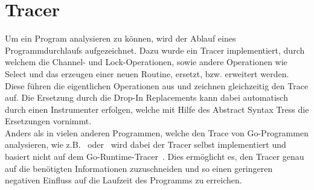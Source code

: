 \chapter{Tracer}
Um ein Program analysieren zu können, wird der Ablauf eines Programmdurchlaufs
aufgezeichnet. Dazu wurde ein Tracer implementiert, durch welchem die 
Channel- und Lock-Operationen, sowie andere Operationen wie Select und das 
erzeugen einer neuen Routine, ersetzt, bzw. erweitert werden. Diese 
führen die eigentlichen Operationen aus und zeichnen gleichzeitig den 
Trace auf. Die Ersetzung durch die Drop-In Replacements kann dabei automatisch 
durch einen Instrumenter erfolgen, welche mit Hilfe des Abstract Syntax Tress 
die Ersetzungen vornimmt.\\
Anders als in vielen anderen Programmen, welche den Trace von Go-Programmen
analysieren, wie z.B.~\cite{GoAt2} oder~\cite{GoVis} wird dabei der Tracer 
selbst implementiert und basiert nicht auf dem Go-Runtime-Tracer~\cite{GoRunTrace}. 
Dies ermöglicht es, den Tracer genau auf die benötigten Informationen zuzuschneiden
und so einen geringeren negativen Einfluss auf die Laufzeit des Programms zu erreichen.


